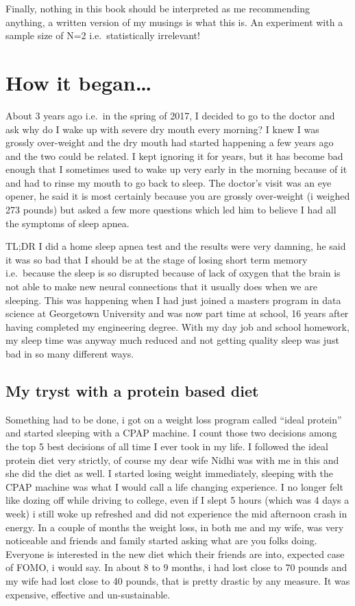 \documentclass[oneside]{book}
\begin{document}
Finally, nothing in this book should be interpreted as me recommending
anything, a written version of my musings is what this is. An experiment
with a sample size of N=2 i.e.~statistically irrelevant!

\chapter{How it began\ldots{}}\label{how-it-began}

About 3 years ago i.e.~in the spring of 2017, I decided to go to the
doctor and ask why do I wake up with severe dry mouth every morning? I
knew I was grossly over-weight and the dry mouth had started happening a
few years ago and the two could be related. I kept ignoring it for
years, but it has become bad enough that I sometimes used to wake up
very early in the morning because of it and had to rinse my mouth to go
back to sleep. The doctor's visit was an eye opener, he said it is most
certainly because you are grossly over-weight (i weighed 273 pounds) but
asked a few more questions which led him to believe I had all the
symptoms of sleep apnea.

TL;DR I did a home sleep apnea test and the results were very damning,
he said it was so bad that I should be at the stage of losing short term
memory i.e.~because the sleep is so disrupted because of lack of oxygen
that the brain is not able to make new neural connections that it
usually does when we are sleeping. This was happening when I had just
joined a masters program in data science at Georgetown University and
was now part time at school, 16 years after having completed my
engineering degree. With my day job and school homework, my sleep time
was anyway much reduced and not getting quality sleep was just bad in so
many different ways.

\section{My tryst with a protein based
diet}\label{my-tryst-with-a-protein-based-diet}

Something had to be done, i got on a weight loss program called ``ideal
protein'' and started sleeping with a CPAP machine. I count those two
decisions among the top 5 best decisions of all time I ever took in my
life. I followed the ideal protein diet very strictly, of course my dear
wife Nidhi was with me in this and she did the diet as well. I started
losing weight immediately, sleeping with the CPAP machine was what I
would call a life changing experience. I no longer felt like dozing off
while driving to college, even if I slept 5 hours (which was 4 days a
week) i still woke up refreshed and did not experience the mid afternoon
crash in energy. In a couple of months the weight loss, in both me and
my wife, was very noticeable and friends and family started asking what
are you folks doing. Everyone is interested in the new diet which their
friends are into, expected case of FOMO, i would say. In about 8 to 9
months, i had lost close to 70 pounds and my wife had lost close to 40
pounds, that is pretty drastic by any measure. It was expensive,
effective and un-sustainable.
\end{document}
